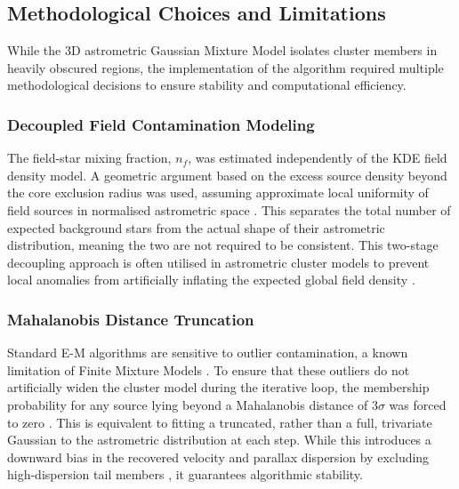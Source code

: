 \documentclass{CU_IOPStyle_PXT999}
\begin{document}
\subsection{Methodological Choices and Limitations}
\label{ssec:3.2}
While the 3D astrometric Gaussian Mixture Model isolates cluster members in heavily obscured regions, the implementation of the algorithm required multiple methodological decisions to ensure stability and computational efficiency. 

\subsubsection{Decoupled Field Contamination Modeling} 
\label{ssec:3.2.1} 
The field-star mixing fraction, $n_f$, was estimated independently of the KDE field density model. A geometric argument based on the excess source density beyond the core exclusion radius was used, assuming approximate local uniformity of field sources in normalised astrometric space \cite{cantat-gaudin_gaia_2018, Sarro_2014}. This separates the total number of expected background stars from the actual shape of their astrometric distribution, meaning the two are not required to be consistent. This two-stage decoupling approach is often utilised in astrometric cluster models to prevent local anomalies from artificially inflating the expected global field density \cite{dias_2014}.

\subsubsection{Mahalanobis Distance Truncation}
\label{ssec:3.2.2}
Standard E-M algorithms are sensitive to outlier contamination, a known limitation of Finite Mixture Models \cite{mclachlan_2000}. To ensure that these outliers do not artificially widen the cluster model during the iterative loop, the membership probability for any source lying beyond a Mahalanobis distance of $3\sigma$ was forced to zero \cite{rosseeuw_1190, krone-martins_upmask_2014}. This is equivalent to fitting a truncated, rather than a full, trivariate Gaussian to the astrometric distribution at each step. While this introduces a downward bias in the recovered velocity and parallax dispersion by excluding high-dispersion tail members \cite{Huber_1981, johnson_1994}, it guarantees algorithmic stability.
\end{document}
